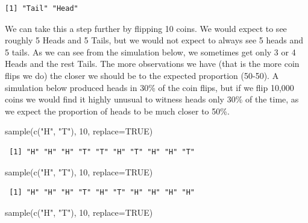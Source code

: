 \documentclass[
  letterpaper,
  DIV=11,
  numbers=noendperiod]{scrreprt}
\newenvironment{Shaded}{\begin{snugshade}}{\end{snugshade}}
\newcommand{\AttributeTok}[1]{\textcolor[rgb]{0.40,0.45,0.13}{#1}}
\newcommand{\ConstantTok}[1]{\textcolor[rgb]{0.56,0.35,0.01}{#1}}
\newcommand{\DecValTok}[1]{\textcolor[rgb]{0.68,0.00,0.00}{#1}}
\newcommand{\FunctionTok}[1]{\textcolor[rgb]{0.28,0.35,0.67}{#1}}
\newcommand{\NormalTok}[1]{\textcolor[rgb]{0.00,0.23,0.31}{#1}}
\newcommand{\StringTok}[1]{\textcolor[rgb]{0.13,0.47,0.30}{#1}}
\begin{document}
\begin{verbatim}
[1] "Tail" "Head"
\end{verbatim}

We can take this a step further by flipping 10 coins. We would expect to
see roughly 5 Heads and 5 Tails, but we would not expect to always see 5
heads and 5 tails. As we can see from the simulation below, we sometimes
get only 3 or 4 Heads and the rest Tails. The more observations we have
(that is the more coin flips we do) the closer we should be to the
expected proportion (50-50). A simulation below produced heads in 30\%
of the coin flips, but if we flip 10,000 coins we would find it highly
unusual to witness heads only 30\% of the time, as we expect the
proportion of heads to be much closer to 50\%.

\begin{Shaded}
\begin{Highlighting}[]
\FunctionTok{sample}\NormalTok{(}\FunctionTok{c}\NormalTok{(}\StringTok{"H"}\NormalTok{, }\StringTok{"T"}\NormalTok{), }\DecValTok{10}\NormalTok{, }\AttributeTok{replace=}\ConstantTok{TRUE}\NormalTok{)}
\end{Highlighting}
\end{Shaded}

\begin{verbatim}
 [1] "H" "H" "H" "T" "T" "H" "T" "H" "H" "T"
\end{verbatim}

\begin{Shaded}
\begin{Highlighting}[]
\FunctionTok{sample}\NormalTok{(}\FunctionTok{c}\NormalTok{(}\StringTok{"H"}\NormalTok{, }\StringTok{"T"}\NormalTok{), }\DecValTok{10}\NormalTok{, }\AttributeTok{replace=}\ConstantTok{TRUE}\NormalTok{)}
\end{Highlighting}
\end{Shaded}

\begin{verbatim}
 [1] "H" "H" "H" "T" "H" "T" "H" "H" "H" "H"
\end{verbatim}

\begin{Shaded}
\begin{Highlighting}[]
\FunctionTok{sample}\NormalTok{(}\FunctionTok{c}\NormalTok{(}\StringTok{"H"}\NormalTok{, }\StringTok{"T"}\NormalTok{), }\DecValTok{10}\NormalTok{, }\AttributeTok{replace=}\ConstantTok{TRUE}\NormalTok{)}
\end{Highlighting}
\end{Shaded}
\end{document}
